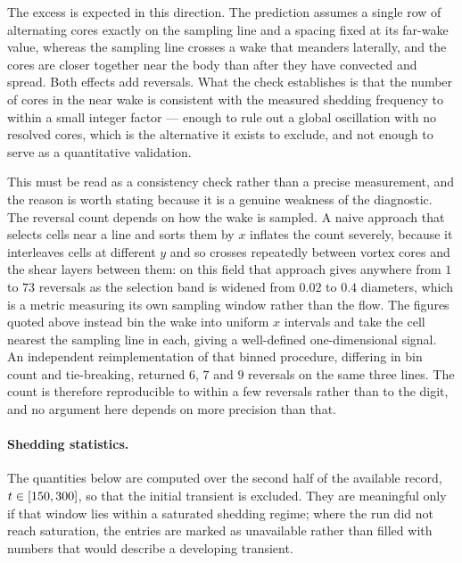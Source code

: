 The excess is expected in this direction. The prediction assumes a single row of
alternating cores exactly on the sampling line and a spacing fixed at its
far-wake value, whereas the sampling line crosses a wake that meanders laterally, and
the cores are closer together near the body than after they have convected and spread.
Both effects add reversals. What the check establishes is that the number of cores in
the near wake is consistent with the measured shedding frequency to within a small
integer factor --- enough to rule out a global oscillation with no resolved cores,
which is the alternative it exists to exclude, and not enough to serve as a
quantitative validation.

This must be read as a consistency check rather than a precise measurement, and the
reason is worth stating because it is a genuine weakness of the diagnostic. The
reversal count depends on how the wake is sampled. A naive approach that selects
cells near a line and sorts them by $x$ inflates the count severely, because it
interleaves cells at different $y$ and so crosses repeatedly between vortex cores
and the shear layers between them: on this field that approach gives anywhere from
$1$ to $73$ reversals as the selection band is widened from $0.02$ to $0.4$
diameters, which is a metric measuring its own sampling window rather than the
flow. The figures quoted above instead bin the wake into uniform $x$ intervals and
take the cell nearest the sampling line in each, giving a well-defined
one-dimensional signal. An independent reimplementation of that binned procedure,
differing in bin count and tie-breaking, returned $6$, $7$ and $9$ reversals on the
same three lines. The count is therefore reproducible to within a few reversals
rather than to the digit, and no argument here depends on more precision than that.

\paragraph{Shedding statistics.} The quantities below are computed over the second
half of the available record, $t\in[\num{150}, \num{300}]$, so that the
initial transient is excluded. They are meaningful only if that window lies within
a saturated shedding regime; where the run did not reach saturation, the entries
are marked as unavailable rather than filled with numbers that would describe a
developing transient.

